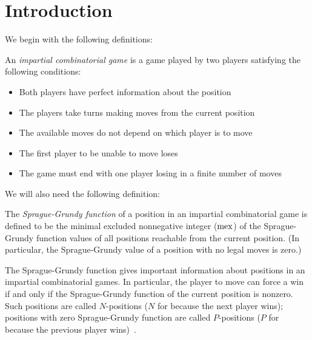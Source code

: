 \documentclass[english,12pt]{article}
\begin{document}
\section{Introduction}
We begin with the following definitions:
\begin{defin}\cite{bcg}
An \emph{impartial combinatorial game} is a game played by two players satisfying the following conditions:
\begin{itemize}
\item Both players have perfect information about the position
\item The players take turns making moves from the current position
\item The available moves do not depend on which player is to move
\item The first player to be unable to move loses
\item The game must end with one player losing in a finite number of moves
\end{itemize}
\end{defin}
We will also need the following definition:
\begin{defin}\cite{bcg}
The \emph{Sprague-Grundy function} of a position in an impartial combinatorial game is defined to be the minimal excluded nonnegative integer ($\operatorname{mex}$) of the Sprague-Grundy function values of all positions reachable from the current position.  (In particular, the Sprague-Grundy value of a position with no legal moves is zero.)
\end{defin}
The Sprague-Grundy function gives important information about positions in an impartial combinatorial games.  In particular, the player to move can force a win if and only if the Sprague-Grundy function of the current position is nonzero.  Such positions are called $N$-positions ($N$ for  because the next player wins); positions with zero Sprague-Grundy function are called $P$-positions ($P$ for  because the previous player wins)~\cite{bcg}.
\end{document}
